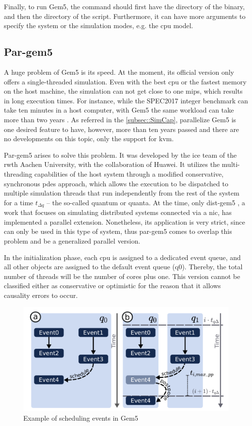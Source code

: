 Finally, to run Gem5, the command should first have the directory of the binary, and then the directory of the script. Furthermore, it can 
have more arguments to specify the system or the simulation modes, e.g. the \gls{cpu} model.

\subsection{Par-gem5}
\label{subsec:pargem5}

A huge problem of Gem5 is its speed. At the moment, its official version only offers a single-threaded simulation. Even with the best 
\gls{cpu} or the fastest memory on the host machine, the simulation can not get close to one \gls{mips}, which results in long execution 
times. For instance, while the SPEC2017 integer benchmark can take ten minutes in a host computer, with Gem5 the same workload can take more 
than two years \cite{pargem5}. As referred in the \autoref{subsec::SimCap}, parallelize Gem5 is one desired feature to have, however, more than 
ten years passed and there are no developments on this topic, only the support for \gls{kvm}. 

Par-gem5 \cite{pargem5} arises to solve this problem. It was developed by the \gls{ice} team of the \gls{rwth} Aachen University, with the 
collaboration of Huawei. It utilizes the multi-threading capabilities of the host system through a modified conservative, synchronous 
\gls{pdes} approach, which allows the execution to be dispatched to multiple simulation threads that run independently from the rest of 
the system for a time $t_{\Delta q}$ – the so-called quantum or quanta. At the time, only dist-gem5 \cite{dist-gem5}, a work that focuses 
on simulating distributed systems connected via a \gls{nic}, has implemented a parallel extension. Nonetheless, its application is very strict, 
since can only be used in this type of system, thus par-gem5 comes to overlap this problem and be a generalized parallel version.

In the initialization phase, each \gls{cpu} is assigned to a dedicated event queue, and all other objects are assigned to the default event 
queue (q0). Thereby, the total number of threads will be the number of cores plus one. This version cannot be classified either as conservative 
or optimistic for the reason that it allows causality errors to occur.

\begin{figure}[H]
	\centering
 	\includegraphics[width=0.7\linewidth]{Images/SchedulingEventGem5.png}
 	\caption{Example of scheduling events in Gem5 \cite{pargem5}}
	 \label{fig_SchedulingEventGem5}
\end{figure}

